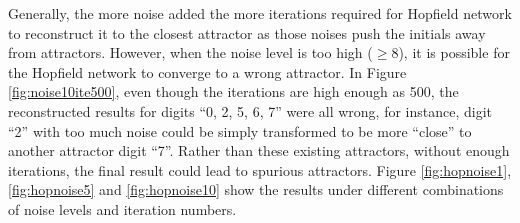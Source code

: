 \documentclass{article}
\begin{document}
Generally, the more noise added the more iterations required for Hopfield network to reconstruct it to the closest attractor as those noises push the initials away from attractors. However, when the noise level is too high ($\geq8$), it is possible for the Hopfield network to converge to a wrong attractor. In Figure \ref{fig:noise10ite500}, even though the iterations are high enough as 500, the reconstructed results for digits ``0, 2, 5, 6, 7'' were all wrong, for instance, digit ``2'' with too much noise could be simply transformed to be more ``close'' to another attractor digit ``7''. Rather than these existing attractors, without enough iterations, the final result could lead to spurious attractors. Figure \ref{fig:hopnoise1}, \ref{fig:hopnoise5} and \ref{fig:hopnoise10} show the results under different combinations of noise levels and iteration numbers.
\end{document}
